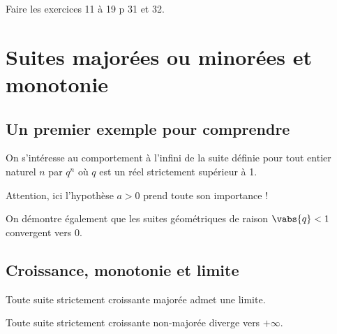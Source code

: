 \documentclass[12pt,a4paper,frenchb]{article}
\begin{document}
Faire les exercices 11 à 19 p 31 et 32.

\pagebreak

\section{Suites majorées ou minorées et monotonie}

\subsection{Un premier exemple pour comprendre}

On s'intéresse au comportement à l'infini de la suite définie pour tout
entier naturel $n$ par $q^n$ où $q$ est un réel strictement supérieur à
1.


Attention, ici l'hypothèse $a>0$ prend toute son importance !


On démontre également que les suites géométriques de raison $\vabs{q} <
1$ convergent vers 0.


\subsection{Croissance, monotonie et limite}

\begin{theoreme}[admis]
  Toute suite strictement croissante majorée admet une limite.
\end{theoreme}

\begin{theoreme}
  Toute suite strictement croissante non-majorée diverge vers $+\infty$.
\end{theoreme}

\end{document}
